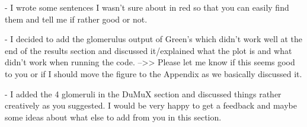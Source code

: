 

- I wrote some sentences I wasn't sure about in red so that you can easily find them and tell me if rather good or not.

- I decided to add the glomerulus output of Green's which didn't work well at the end of the results section and discussed it/explained what the plot is and what didn't work when running the code.
-->> Please let me know if this seems good to you or if I should move the figure to the Appendix as we basically discussed it.

- I added the 4 glomeruli in the DuMuX section and discussed things rather creatively as you suggested. I would be very happy to get a feedback and maybe some ideas about what else to add from you in this section.